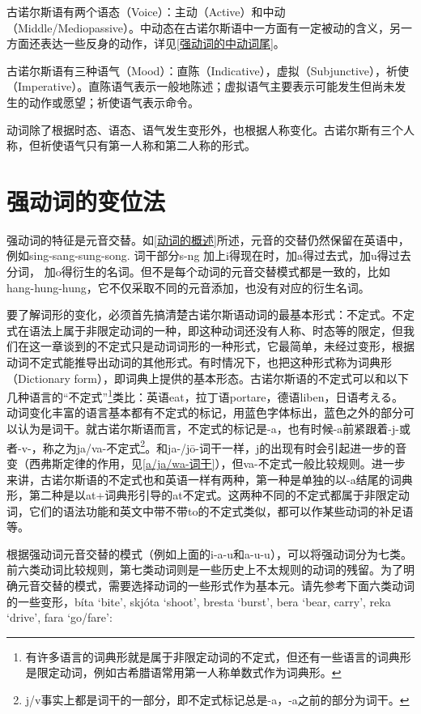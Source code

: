 古诺尔斯语有两个语态（Voice）：主动（Active）和中动（Middle/Mediopassive）。中动态在古诺尔斯语中一方面有一定被动的含义，另一方面还表达一些反身的动作，详见\ref{强动词的中动词尾}。

古诺尔斯语有三种语气（Mood）：直陈（Indicative），虚拟（Subjunctive），祈使（Imperative）。直陈语气表示一般地陈述；虚拟语气主要表示可能发生但尚未发生的动作或愿望；祈使语气表示命令。

动词除了根据时态、语态、语气发生变形外，也根据人称变化。古诺尔斯有三个人称，但祈使语气只有第一人称和第二人称的形式。

\section{强动词的变位法}\label{强动词的变位法}

强动词的特征是元音交替。如\ref{动词的概述}所述，元音的交替仍然保留在英语中，例如sing-sang-sung-song.
词干部分s-ng 加上i得现在时，加a得过去式，加u得过去分词，
加o得衍生的名词。但不是每个动词的元音交替模式都是一致的，比如hang-hung-hung，它不仅采取不同的元音添加，也没有对应的衍生名词。

要了解词形的变化，必须首先搞清楚古诺尔斯语动词的最基本形式：不定式。不定式在语法上属于非限定动词的一种，即这种动词还没有人称、时态等的限定，但我们在这一章谈到的不定式只是动词词形的一种形式，它最简单，未经过变形，根据动词不定式能推导出动词的其他形式。有时情况下，也把这种形式称为词典形（Dictionary
form），即词典上提供的基本形态。古诺尔斯语的不定式可以和以下几种语言的``不定式''\footnote{有许多语言的词典形就是属于非限定动词的不定式，但还有一些语言的词典形是限定动词，例如古希腊语常用第一人称单数式作为词典形。}类比：英语eat，拉丁语portare，德语liben，日语考える。动词变化丰富的语言基本都有不定式的标记，用蓝色字体标出，蓝色之外的部分可以认为是词干。就古诺尔斯语而言，不定式的标记是-a，也有时候-a前紧跟着-j-或者-v-，称之为ja/va-不定式\footnote{j/v事实上都是词干的一部分，即不定式标记总是-a，-a之前的部分为词干。}。和ja-/jō-词干一样，j的出现有时会引起进一步的音变（西弗斯定律的作用，见\ref{a/ja/wa-词干}），但va-不定式一般比较规则。进一步来讲，古诺尔斯语的不定式也和英语一样有两种，第一种是单独的以-a结尾的词典形，第二种是以at+词典形引导的at不定式。这两种不同的不定式都属于非限定动词，它们的语法功能和英文中带不带to的不定式类似，都可以作某些动词的补足语等。

根据强动词元音交替的模式（例如上面的i-a-u和a-u-u），可以将强动词分为七类。前六类动词比较规则，第七类动词则是一些历史上不太规则的动词的残留。为了明确元音交替的模式，需要选择动词的一些形式作为基本元。请先参考下面六类动词的一些变形，bíta
`bite', skjóta `shoot', bresta `burst', bera `bear, carry', reka
`drive‌', fara `go/fare‌':

